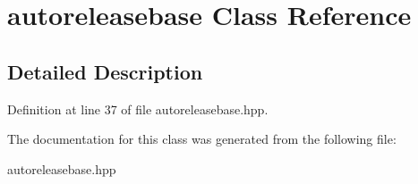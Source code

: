 \hypertarget{classautoreleasebase}{}\section{autoreleasebase Class Reference}
\label{classautoreleasebase}


\subsection{Detailed Description}


Definition at line 37 of file autoreleasebase.\+hpp.



The documentation for this class was generated from the following file\+:\begin{DoxyCompactItemize}
\item 
autoreleasebase.\+hpp\end{DoxyCompactItemize}
